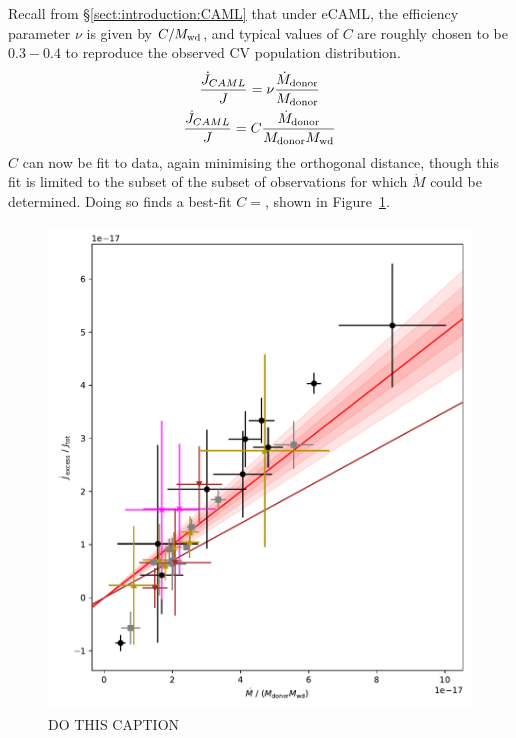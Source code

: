 Recall from \S\ref{sect:introduction:CAML} that under eCAML, the efficiency parameter $\nu$ is given by $C/M_{\rm wd}$, and typical values of $C$ are roughly chosen to be $0.3 - 0.4$ to reproduce the observed CV population distribution.
\begin{gather}
    \frac{\dot J_{CAML}}{J} = \nu \frac{\dot M_{\rm donor}}{M_{\rm donor}} \label{eqn:ecaml general} \\
    \frac{\dot J_{CAML}}{J} = C \frac{\dot M_{\rm donor}}{M_{\rm donor} M_{\rm wd}}
\end{gather}
$C$ can now be fit to data, again minimising the orthogonal distance, though this fit is limited to the subset of the subset of observations for which $\dot M$ could be determined.
Doing so finds a best-fit $C =$, shown in Figure~\ref{fig:massloss and AML:calibrating ecaml relationship}. 
\begin{figure}
    \centering
    \includegraphics[width=\textwidth]{figures/results/Mdot/eCAML_nu_no_intercept_fit.pdf}
    \caption{DO THIS CAPTION}
    \label{fig:massloss and AML:calibrating ecaml relationship}
\end{figure}


